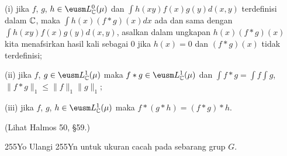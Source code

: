 {\quad (i) jika $f$, $g$, $h\in\eusm L^0_{\Bbb C}(\mu)$ dan $\int
h(xy)f(x)g(y)d(x,y)$ terdefinisi dalam $\Bbb C$, maka $\int h(x)(f*g)(x)dx$
ada dan sama dengan $\int h(xy)f(x)g(y)d(x,y)$, asalkan
dalam ungkapan $h(x)(f*g)(x)$ kita menafsirkan hasil kali sebagai $0$ jika
$h(x)=0$ dan $(f*g)(x)$ tidak terdefinisi;

\quad (ii) jika $f$, $g\in\eusm L^1_{\Bbb C}(\mu)$ maka $f*g\in\eusm
L^1_{\Bbb C}(\mu)$ dan $\int f*g=\int f\int g$,
$\|f*g\|_1\le\|f\|_1\|g\|_1$;

\quad (iii) jika $f$, $g$, $h\in\eusm L^1_{\Bbb C}(\mu)$ maka
$f*(g*h)=(f*g)*h$.

\noindent (Lihat {\smc Halmos 50}, \S59.)

\spheader 255Yo Ulangi 255Yn untuk ukuran cacah pada sebarang grup $G$.
}%

